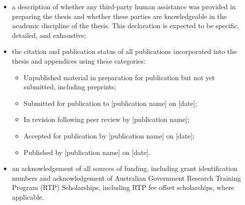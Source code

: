 {\begin{itemize}
		\item[\tiny{$\blacksquare$}] a description of whether any third-party human assistance was provided in preparing the thesis and whether these parties are knowledgeable in the academic discipline of the thesis. This declaration is expected to be specific, detailed, and exhaustive;
		\item[\tiny{$\blacksquare$}] the citation and publication status of all publications incorporated into the thesis and appendices using these categories:
		      \begin{itemize}
			      \item Unpublished material in preparation for publication but not yet submitted, including preprints;
			      \item Submitted for publication to [publication name] on [date];
			      \item In revision following peer review by [publication name];
			      \item Accepted for publication by [publication name] on [date];
			      \item Published by [publication name] on [date].
		      \end{itemize}
		\item[\tiny{$\blacksquare$}] an acknowledgement of all sources of funding, including grant identification numbers and acknowledgement of Australian Government Research Training Program (RTP) Scholarships, including RTP fee offset scholarships, where applicable.
	\end{itemize}

}
